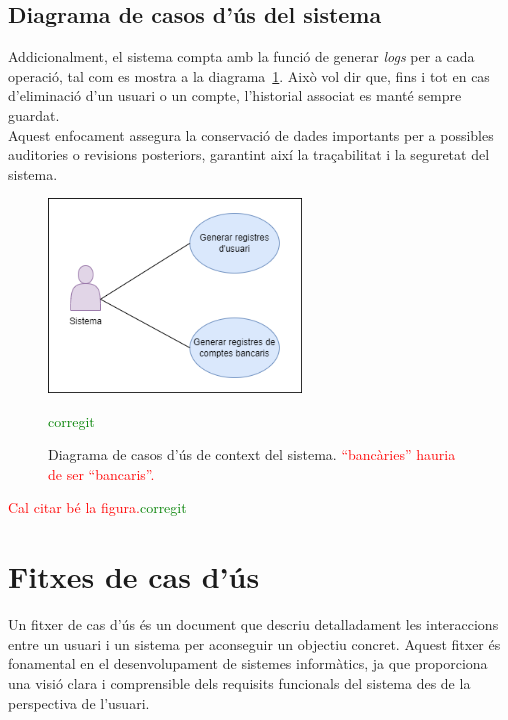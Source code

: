 \documentclass[a4paper,12pt,twoside]{ThesisStyle}
\newcommand{\pau}[1]{\textcolor{red}{#1}}
\newcommand{\sudan}[1]{\textcolor{green}{#1}}
\begin{document}
\subsection{Diagrama de casos d'ús del sistema}
\label{subsec: Diagrama de casos d'ús del sistema}

Addicionalment, el sistema compta amb la funció de generar \textit{logs} per a cada operació, tal com es mostra a la diagrama~\ref{fig:Diagrama de Casos d'Ús de Context del sistema}. Això vol dir que, fins i tot en cas d'eliminació d'un usuari o un compte, l'historial associat es manté sempre guardat.\\

Aquest enfocament assegura la conservació de dades importants per a possibles auditories o revisions posteriors, garantint així la traçabilitat i la seguretat del sistema.


\begin{figure}[h]
    \centering
    \includegraphics[width=0.6\textwidth]{imatges/logs.png}
    \caption{Diagrama de casos d'ús de context del sistema. \pau{``bancàries'' hauria de ser ``bancaris''.}}\sudan{corregit}
    \label{fig:Diagrama de Casos d'Ús de Context del sistema}
\end{figure}

\pau{Cal citar bé la figura.}\sudan{corregit}



\section{Fitxes de cas d'ús}
\label{sec: fitxes de cas d'ús}

Un fitxer de cas d'ús és un document que descriu detalladament les interaccions entre un usuari i un sistema per aconseguir un objectiu concret. Aquest fitxer és fonamental en el desenvolupament de sistemes informàtics, ja que proporciona una visió clara i comprensible dels requisits funcionals del sistema des de la perspectiva de l'usuari.\\
\end{document}
